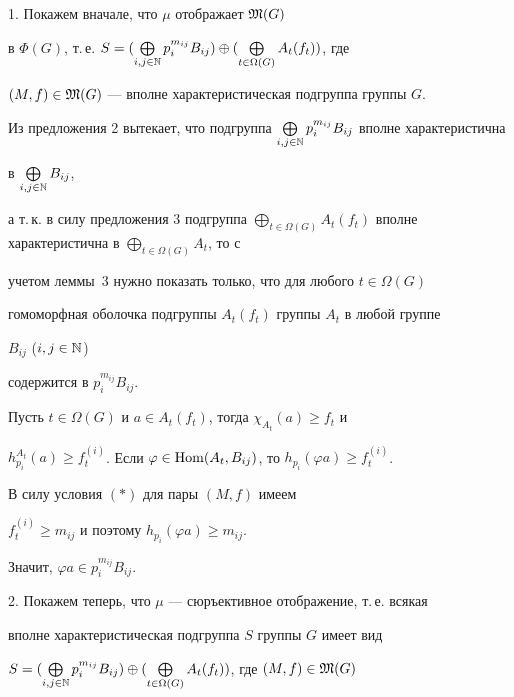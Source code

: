\begin{pf}


1. Покажем вначале, что $\mu$ отображает $\frak M(G)$


в $\Phi(G)$, т.\,е. $S=(\bigoplus\limits_{i,j\in\Bbb N}p_i^{m_{ij}}B_{ij})


\oplus(\bigoplus\limits_{t\in\Omega(G)}A_t(f_t))$, где


$(M, f)\in\frak M(G)$ --- вполне характеристическая подгруппа группы $G$.


Из предложения 2 вытекает, что подгруппа $\bigoplus\limits_{i,j\in\Bbb N}p_i


^{m_{ij}}B_{ij}$ вполне характеристична


в $\bigoplus\limits_{i,j\in\Bbb N}B_{ij}$,


а т.\,к. в силу предложения 3 подгруппа $\bigoplus\limits_{t\in\Omega(G)}


A_t(f_t)$ вполне характеристична в $\bigoplus\limits_{t\in\Omega(G)}A_t$, то с


учетом леммы~3 нужно показать только, что для любого $t\in\Omega(G)$


гомоморфная оболочка подгруппы $A_t(f_t)$ группы $A_t$ в любой группе


$B_{ij}$ ($i,j\in\Bbb N$)


содержится в $p_i^{m_{ij}}B_{ij}$.





Пусть $t\in\Omega(G)$ и $a\in A_t(f_t)$, тогда $\chi_{A_t}(a)\geqslant f_t$ и


$h^{A_t}_{p_i}(a)\geqslant f^{(i)}_t$. Если $\varphi\in


\Hom(A_t, B_{ij})$, то $h_{p_i}(\varphi a)\geqslant f^{(i)}_t$.


В силу условия $(\ast)$ для пары $(M, f)$ имеем


$f^{(i)}_t\geqslant m_{ij}$ и поэтому $h_{p_i}(\varphi a)\geqslant m_{ij}$.


Значит, $\varphi a\in p_i^{m_{ij}}B_{ij}$.





2. Покажем теперь, что $\mu$ --- сюръективное отображение, т.\,е. всякая


вполне характеристическая подгруппа $S$ группы $G$ имеет вид


$S=(\bigoplus\limits_{i,j\in\Bbb N}p_i^{m_{ij}}B_{ij})\oplus


(\bigoplus\limits_{t\in\Omega(G)}A_t(f_t))$, где $(M, f)\in\frak M(G)$



\end{pf}
